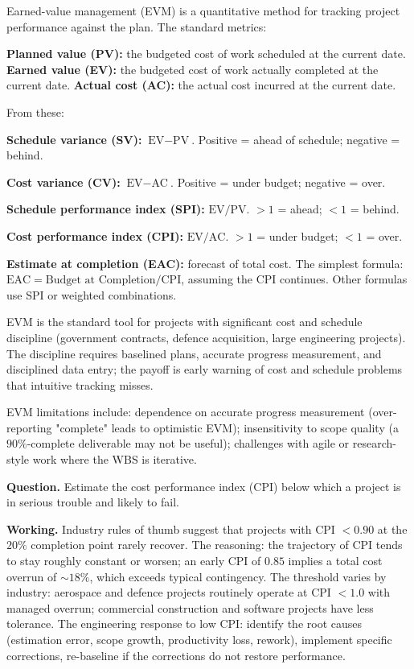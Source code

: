 Earned-value management (EVM) is a quantitative method for tracking project performance against the plan. The standard metrics:

\textbf{Planned value (PV):} the budgeted cost of work scheduled at the current date.
\textbf{Earned value (EV):} the budgeted cost of work actually completed at the current date.
\textbf{Actual cost (AC):} the actual cost incurred at the current date.

From these:

\textbf{Schedule variance (SV):} $\text{EV} - \text{PV}$. Positive = ahead of schedule; negative = behind.

\textbf{Cost variance (CV):} $\text{EV} - \text{AC}$. Positive = under budget; negative = over.

\textbf{Schedule performance index (SPI):} $\text{EV}/\text{PV}$. $> 1$ = ahead; $< 1$ = behind.

\textbf{Cost performance index (CPI):} $\text{EV}/\text{AC}$. $> 1$ = under budget; $< 1$ = over.

\textbf{Estimate at completion (EAC):} forecast of total cost. The simplest formula: $\text{EAC} = \text{Budget at Completion} / \text{CPI}$, assuming the CPI continues. Other formulas use SPI or weighted combinations.

EVM is the standard tool for projects with significant cost and schedule discipline (government contracts, defence acquisition, large engineering projects). The discipline requires baselined plans, accurate progress measurement, and disciplined data entry; the payoff is early warning of cost and schedule problems that intuitive tracking misses.

EVM limitations include: dependence on accurate progress measurement (over-reporting "complete" leads to optimistic EVM); insensitivity to scope quality (a $90\%$-complete deliverable may not be useful); challenges with agile or research-style work where the WBS is iterative.

\begin{estimation}
\textbf{Question.} Estimate the cost performance index (CPI) below which a project is in serious trouble and likely to fail.

\textbf{Working.} Industry rules of thumb suggest that projects with CPI $< 0.90$ at the $20\%$ completion point rarely recover. The reasoning: the trajectory of CPI tends to stay roughly constant or worsen; an early CPI of $0.85$ implies a total cost overrun of $\sim 18\%$, which exceeds typical contingency. The threshold varies by industry: aerospace and defence projects routinely operate at CPI $< 1.0$ with managed overrun; commercial construction and software projects have less tolerance. The engineering response to low CPI: identify the root causes (estimation error, scope growth, productivity loss, rework), implement specific corrections, re-baseline if the corrections do not restore performance.
\end{estimation}

